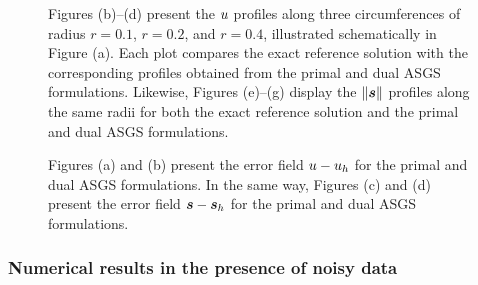 \begin{figure}[ht!!]
	\centering
	\caption{Figures (b)--(d) present the $u$ profiles along three circumferences of radius $r = 0.1$, $r = 0.2$, and $r = 0.4$, illustrated schematically in Figure (a). Each plot compares the exact reference solution with the corresponding profiles obtained from the primal and dual ASGS formulations. Likewise, Figures (e)--(g) display the $\|\bm{s}\|$ profiles along the same radii for both the exact reference solution and the primal and dual ASGS formulations.}
	\fontsize{8pt}{10pt}\selectfont 
	\def\svgwidth{1.0\columnwidth}
	
	\label{fig:plot_over_curve_u_s_primal_dual_ASGS}
\end{figure}

\begin{figure}[ht!!]
	\centering
	\caption{Figures (a) and (b) present the error field $u - u_h$ for the primal and dual ASGS formulations. In the same way, Figures (c) and (d) present the error field $\bm{s} - \bm{s}_h$ for the primal and dual ASGS formulations.}
	\fontsize{12pt}{10pt}\selectfont 
	\def\svgwidth{1.0\columnwidth}
	
	\label{fig:inclusion_udif_sdif_primal_dual_ASGS}
\end{figure}

\subsubsection*{Numerical results in the presence of noisy data}

